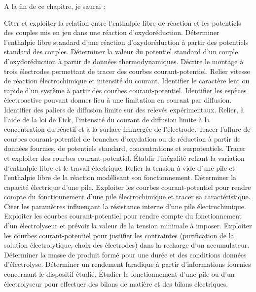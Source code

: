 A la fin de ce chapitre, je saurai :
\begin{competences}
    \point Citer et exploiter la relation entre l’enthalpie libre de     réaction et les potentiels des couples mis en jeu dans une réaction d’oxydoréduction.
    \point Déterminer l’enthalpie libre standard d’une réaction d’oxydoréduction à partir des potentiels standard des couples.
    \point Déterminer la valeur du potentiel standard d’un couple d’oxydoréduction à partir de données thermodynamiques.
    \point Décrire le montage à trois électrodes permettant de tracer des courbes courant-potentiel.
    \point Relier vitesse de réaction électrochimique et intensité du courant.
    \point Identifier le caractère lent ou rapide d’un système à partir des courbes courant-potentiel.
    \point Identifier les espèces électroactive pouvant donner lieu à une limitation en courant par diffusion.
    \point Identifier des paliers de diffusion limite sur des relevés expérimentaux.
    \point Relier, à l’aide de la loi de Fick, l'intensité du courant de diffusion limite à la concentration du réactif et à la surface immergée de l'électrode.
    \point Tracer l’allure de courbes courant-potentiel de branches d’oxydation ou de réduction à partir de données fournies, de potentiels standard, concentrations et surpotentiels.
    \point \faSignLanguage Tracer et exploiter des courbes courant-potentiel.
    \point Établir l’inégalité reliant la variation d’enthalpie libre et le travail électrique.
    \point Relier la tension à vide d’une pile et l’enthalpie libre de la réaction modélisant son fonctionnement.
    \point Déterminer la capacité électrique d’une pile.
    \point Exploiter les courbes courant-potentiel pour rendre compte du fonctionnement d’une pile électrochimique et tracer sa caractéristique.
    \point Citer les paramètres influençant la résistance interne d’une pile électrochimique.
    \point Exploiter les courbes courant-potentiel pour rendre compte du fonctionnement d’un électrolyseur et prévoir la valeur de la tension minimale à imposer.
    \point Exploiter les courbes courant-potentiel pour justifier les contraintes (purification de la solution électrolytique, choix des électrodes) dans la recharge d’un accumulateur.
    \point Déterminer la masse de produit formé pour une durée et des conditions données d’électrolyse.
    \point Déterminer un rendement faradique à partir d’informations fournies concernant le dispositif étudié.
    \point \faSignLanguage Étudier le fonctionnement d’une pile ou d’un électrolyseur pour effectuer des bilans de matière et des bilans électriques.

\end{competences}
